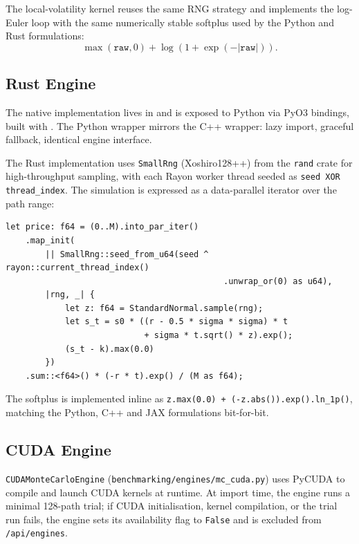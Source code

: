 The local-volatility kernel reuses the same RNG strategy and implements the
log-Euler loop with the same numerically stable softplus used by the Python
and Rust formulations:
\[
    \max(\texttt{raw}, 0) + \log\!\left(1 + \exp(-|\texttt{raw}|)\right).
\]

\subsection{Rust Engine}
\label{sec:impl-rust}

The native implementation lives in  and is
exposed to Python via PyO3 bindings, built with
. The Python wrapper
 mirrors the C++ wrapper: lazy import,
graceful fallback, identical engine interface.

The Rust implementation uses \texttt{SmallRng} (Xoshiro128++) from the
\texttt{rand} crate for high-throughput sampling, with each Rayon worker thread
seeded as \texttt{seed XOR thread\_index}. The simulation is expressed as a
data-parallel iterator over the path range:

\begin{verbatim}
let price: f64 = (0..M).into_par_iter()
    .map_init(
        || SmallRng::seed_from_u64(seed ^ rayon::current_thread_index()
                                            .unwrap_or(0) as u64),
        |rng, _| {
            let z: f64 = StandardNormal.sample(rng);
            let s_t = s0 * ((r - 0.5 * sigma * sigma) * t
                            + sigma * t.sqrt() * z).exp();
            (s_t - k).max(0.0)
        })
    .sum::<f64>() * (-r * t).exp() / (M as f64);
\end{verbatim}

The softplus is implemented inline as
\texttt{z.max(0.0) + (-z.abs()).exp().ln\_1p()}, matching the Python, C++ and JAX
formulations bit-for-bit.

\subsection{CUDA Engine}
\label{sec:impl-cuda}

\texttt{CUDAMonteCarloEngine} (\texttt{benchmarking/engines/mc\_cuda.py}) uses
PyCUDA to compile and launch CUDA kernels at runtime. At import time, the engine
runs a minimal 128-path trial; if CUDA initialisation, kernel compilation, or
the trial run fails, the engine sets its availability flag to \texttt{False} and
is excluded from \texttt{/api/engines}.

